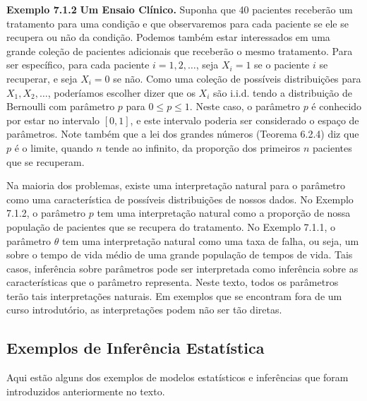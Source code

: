 \vspace{1cm}
\noindent\textbf{Exemplo 7.1.2} \quad \textbf{Um Ensaio Clínico.} Suponha que 40 pacientes receberão um tratamento para uma condição e que observaremos para cada paciente se ele se recupera ou não da condição. Podemos também estar interessados em uma grande coleção de pacientes adicionais que receberão o mesmo tratamento. Para ser específico, para cada paciente $i = 1, 2, \dots$, seja $X_i = 1$ se o paciente $i$ se recuperar, e seja $X_i = 0$ se não. Como uma coleção de possíveis distribuições para $X_1, X_2, \dots$, poderíamos escolher dizer que os $X_i$ são i.i.d. tendo a distribuição de Bernoulli com parâmetro $p$ para $0 \le p \le 1$. Neste caso, o parâmetro $p$ é conhecido por estar no intervalo $[0, 1]$, e este intervalo poderia ser considerado o espaço de parâmetros. Note também que a lei dos grandes números (Teorema 6.2.4) diz que $p$ é o limite, quando $n$ tende ao infinito, da proporção dos primeiros $n$ pacientes que se recuperam.

\vspace{1cm}
Na maioria dos problemas, existe uma interpretação natural para o parâmetro como uma característica de possíveis distribuições de nossos dados. No Exemplo 7.1.2, o parâmetro $p$ tem uma interpretação natural como a proporção de nossa população de pacientes que se recupera do tratamento. No Exemplo 7.1.1, o parâmetro $\theta$ tem uma interpretação natural como uma taxa de falha, ou seja, um sobre o tempo de vida médio de uma grande população de tempos de vida. Tais casos, inferência sobre parâmetros pode ser interpretada como inferência sobre as características que o parâmetro representa. Neste texto, todos os parâmetros terão tais interpretações naturais. Em exemplos que se encontram fora de um curso introdutório, as interpretações podem não ser tão diretas.

\subsection*{Exemplos de Inferência Estatística}
Aqui estão alguns dos exemplos de modelos estatísticos e inferências que foram introduzidos anteriormente no texto.

